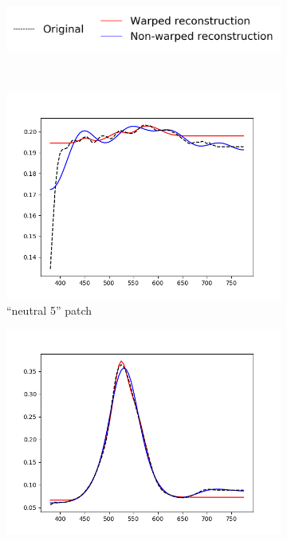 \begin{figure}[t]
	\centering
	\captionsetup[subfigure]{font=footnotesize,labelfont=footnotesize}
	\captionsetup[subfigure]{justification=centering}
	\begin{subfigure}[t]{0.60\textwidth}
		\includegraphics[width=\linewidth]{img/results_techniqueLegend.png}
	\end{subfigure} \\
	\begin{subfigure}[t]{0.45\textwidth}
		\includegraphics[width=\linewidth]{img/results_techniqueNeutral5.png}
		\caption{``neutral 5'' patch}
		\label{fig:resultsTechnique_neutral5}
	\end{subfigure} \hspace{0.1em}
	\begin{subfigure}[t]{0.45\textwidth}
		\includegraphics[width=\linewidth]{img/results_techniqueGreen.png}

\end{subfigure}
\end{figure}
